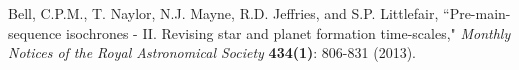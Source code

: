 \begin{thebibliography}{99}

 Bell, C.P.M., T. Naylor, N.J. Mayne, R.D. Jeffries, and S.P. Littlefair, ``Pre-main-sequence isochrones - II. Revising star and planet formation time-scales," \textit{Monthly Notices of the Royal Astronomical Society} \textbf{434(1)}: 806-831 (2013).

\end{thebibliography}